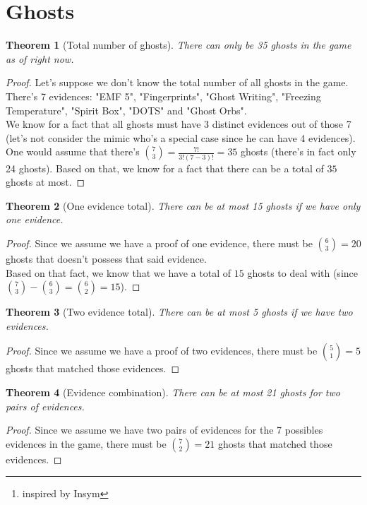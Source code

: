 \documentclass[12pt, letterpaper]{article}
\newtheorem{theorem}{Theorem}
\begin{document}
    \author{Luca Friquet \thanks{inspired by Insym}}

    \section{Ghosts}

    \begin{theorem}[Total number of ghosts]
        There can only be 35 ghosts in the game as of right now.
    \end{theorem}
    \begin{proof}
        Let's suppose we don't know the total number of all ghosts in the game.\\
        There's 7 evidences: "EMF 5", "Fingerprints", "Ghost Writing", "Freezing Temperature", "Spirit Box", "DOTS" and "Ghost Orbs".\\
        We know for a fact that all ghosts must have 3 distinct evidences out of those 7 (let's not consider the mimic who's a special case since he can have 4 evidences).\\
        One would assume that there's ${7 \choose 3} = \frac{7!}{3!(7-3)!} = 35$ ghosts (there's in fact only 24 ghosts).
        Based on that, we know for a fact that there can be a total of $35$ ghosts at most.
    \end{proof}

    \begin{theorem}[One evidence total]
        There can be at most 15 ghosts if we have only one evidence.
    \end{theorem}
    \begin{proof}
        Since we assume we have a proof of one evidence, there must be ${6 \choose 3}=20$ ghosts that doesn't possess that said evidence.\\
        Based on that fact, we know that we have a total of $15$ ghosts to deal with (since ${7 \choose 3} - {6 \choose 3} = {6 \choose 2} = 15$).
    \end{proof}

    \begin{theorem}[Two evidence total]
        There can be at most 5 ghosts if we have two evidences.
    \end{theorem}
    \begin{proof}
        Since we assume we have a proof of two evidences, there must be ${5 \choose 1}=5$ ghosts that matched those evidences.
    \end{proof}

    \begin{theorem}[Evidence combination]
        There can be at most 21 ghosts for two pairs of evidences.
    \end{theorem}
    \begin{proof}
        Since we assume we have two pairs of evidences for the 7 possibles evidences in the game, there must be ${7 \choose 2}=21$ ghosts that matched those evidences.
    \end{proof}
\end{document}
